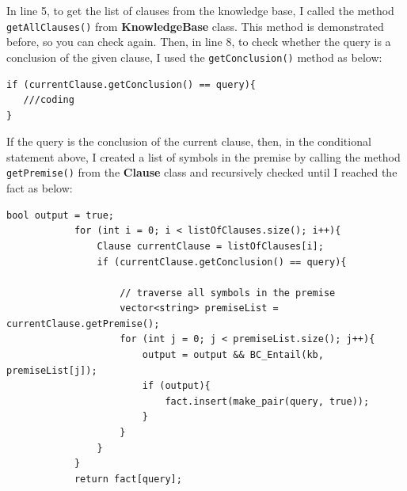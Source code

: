 \documentclass{assignment}
\begin{document}
In line 5, to get the list of clauses from the knowledge base, I called the method \texttt{getAllClauses()} from \textbf{KnowledgeBase} class. This method is demonstrated before, so you can check again. Then, in line 8, to check whether the query is a conclusion of the given clause, I used the \texttt{getConclusion()} method as below:

\lstset{language=C++}
\begin{lstlisting}[caption={Checking whether the query is the conclusion of the given clause}]
if (currentClause.getConclusion() == query){
   ///coding
}
\end{lstlisting}

If the query is the conclusion of the current clause, then, in the conditional statement above, I created a list of symbols in the premise by calling the method \texttt{getPremise()} from the \textbf{Clause} class and recursively checked until I reached the fact as below:

\lstset{language=C++}
\begin{lstlisting}[caption={Implementation from lines 7 to 18}]
bool output = true;
            for (int i = 0; i < listOfClauses.size(); i++){
                Clause currentClause = listOfClauses[i];
                if (currentClause.getConclusion() == query){
                    
                    // traverse all symbols in the premise
                    vector<string> premiseList = currentClause.getPremise();
                    for (int j = 0; j < premiseList.size(); j++){
                        output = output && BC_Entail(kb, premiseList[j]);   
                        if (output){
                            fact.insert(make_pair(query, true));
                        }
                    }
                }
            }
            return fact[query];
\end{lstlisting}
\end{document}
